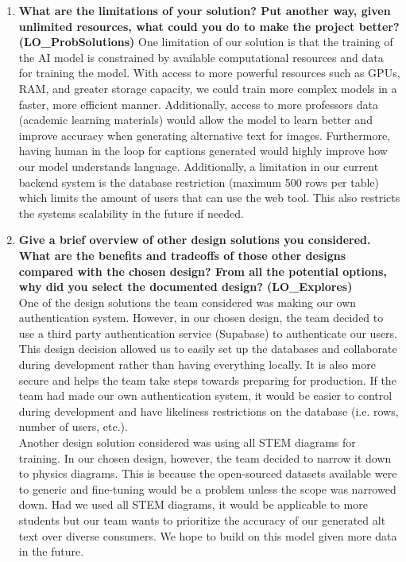 \documentclass[12pt, titlepage]{article}
\begin{document}
\begin{enumerate}
  \item \textbf{What are the limitations of your solution?  Put another way, given
  unlimited resources, what could you do to make the project better? (LO\_ProbSolutions)}
  One limitation of our solution is that the training of the AI model is constrained 
  by available computational resources and data for training the model. With access 
  to more powerful resources such as GPUs, RAM, and greater storage capacity, we could train 
  more complex models in a faster, more efficient manner. Additionally, access to more professors
  data (academic learning materials) would allow the model to learn better and improve accuracy 
  when generating alternative text for images. Furthermore, having human in the loop for captions 
  generated would highly improve how our model understands language. Additionally, a limitation 
  in our current backend system is the database restriction (maximum 500 rows per 
  table) which limits the amount of users that can use the web tool. This also restricts the 
  systems scalability in the future if needed. 

  \item \textbf{Give a brief overview of other design solutions you considered.  What
  are the benefits and tradeoffs of those other designs compared with the chosen
  design?  From all the potential options, why did you select the documented design?
  (LO\_Explores)} \\
  One of the design solutions the team considered was making our own authentication system. 
  However, in our chosen design, the team decided to use a third party authentication service 
  (Supabase) to authenticate our users. This design decision allowed us to easily set up the 
  databases and collaborate during development rather than having everything locally. It is also 
  more secure and helps the team take steps towards preparing for production. If the team had made
  our own authentication system, it would be easier to control during development and have likeliness
  restrictions on the database (i.e. rows, number of users, etc.). \\
  Another design solution considered was using all STEM diagrams for training. In our chosen design,
  however, the team decided to narrow it down to physics diagrams. This is because the open-sourced
  datasets available were to generic and fine-tuning would be a problem unless the scope was narrowed 
  down. Had we used all STEM diagrams, it would be applicable to more students but our team wants to 
  prioritize the accuracy of our generated alt text over diverse consumers. We hope to build 
  on this model given more data in the future. 




\end{enumerate}
\end{document}
